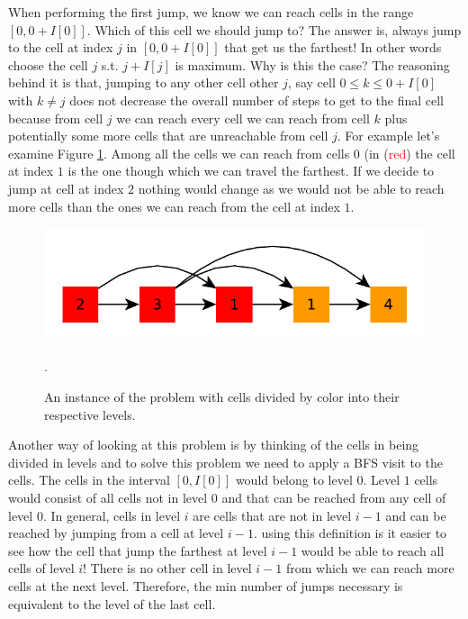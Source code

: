 When performing the first jump, we know we can reach cells in the range $[0,0+I[0]]$. Which of this cell we should jump to?
The answer is, always jump to the cell at index $j$ in $[0,0+I[0]]$ that get us the farthest! In other words choose the cell $j$ s.t. $j+I[j]$ is maximum.
Why is this the case? 
The reasoning behind it is that, jumping to any other cell other $j$, say cell $0 \leq k \leq 0+I[0]$ with $k \neq j$ does not decrease the overall number of steps to get to the final cell because from cell $j$ we can reach every cell we can reach from cell $k$ plus potentially some more cells that are unreachable from cell $j$.
For example let's examine Figure \ref{fig:can_jump:can_jump2_example1}. Among all the cells we can reach from cells $0$ (in (\textcolor{red}{red}) the cell at index $1$ is the one though which we can travel the farthest. If we decide to jump at cell at index $2$ nothing would change as we would not be able to reach more cells than the ones we can reach from the cell at index $1$.

\begin{figure}
    \centering
    \includegraphics[width=\textwidth]{sources/can_jump/images/can_jump2_example1}
    \caption[]{An instance of the problem with cells divided by color into their respective levels.}.
    \label{fig:can_jump:can_jump2_example1}
\end{figure}

Another way of looking at this problem is by thinking of the cells in being divided in levels and to solve this problem we need to apply a BFS visit to the cells. 
The cells in the interval $[0,I[0]]$ would belong to level $0$. Level $1$ cells would consist of all cells not in level $0$ and that can be reached from any cell of level $0$. 
In general, cells in level $i$ are cells that are not in level $i-1$ and can be reached by jumping from a cell at level $i-1$.
using this definition is it easier to see how the cell that jump the farthest at level $i-1$ would be able to reach all cells of level $i$! There is no other cell in level $i-1$ from which we can reach more cells at the next level.
Therefore, the min number of jumps necessary is equivalent to the level of the last cell.


